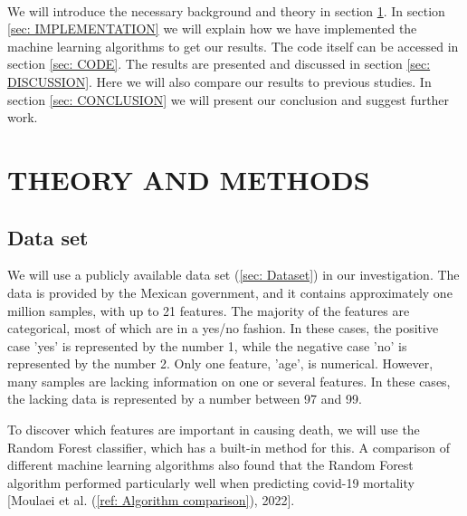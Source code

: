 \documentclass[english,notitlepage,reprint,nofootinbib]{revtex4-1}  %
\begin{document}
\\
We will introduce the necessary background and theory in section \ref{sec: METHODS}. In section \ref{sec: IMPLEMENTATION} we will explain how we have implemented the machine learning algorithms to get our results. The code itself can be accessed in section \ref{sec: CODE}. The results are presented and discussed in section \ref{sec: DISCUSSION}. Here we will also compare our results to previous studies. In section \ref{sec: CONCLUSION} we will present our conclusion and suggest further work. 

\section{THEORY AND METHODS}
\label{sec: METHODS}


\subsection{Data set}\label{subsec: DATA}
We will use a publicly available data set (\ref{sec: Dataset}) in our investigation. The data is provided by the Mexican government, and it contains approximately one million samples, with up to 21 features. The majority of the features are categorical, most of which are in a yes/no fashion. In these cases, the positive case 'yes' is represented by the number 1, while the negative case 'no' is represented by the number 2. Only one feature, 'age', is numerical. 
However, many samples are lacking information on one or several features. In these cases, the lacking data is represented by a number between 97 and 99. %

To discover which features are important in causing death, we will use the Random Forest classifier, which has a built-in method for this. A comparison of different machine learning algorithms also found that the Random Forest algorithm performed particularly well when predicting covid-19 mortality [Moulaei et al. (\ref{ref: Algorithm comparison}), 2022].
\end{document}
